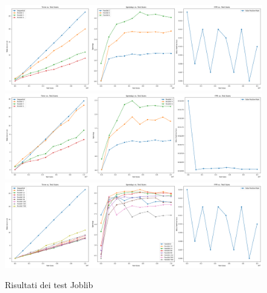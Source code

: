 \documentclass[11pt]{article}
\begin{document}
    \begin{figure}
        \includegraphics[width=\textwidth]{plot_setup}
        \includegraphics[width=\textwidth]{plot_filter}
        \includegraphics[width=\textwidth]{plot_chunks}
        \caption{Risultati dei test Joblib}\label{fig:joblib-result}
    \end{figure}
\end{document}
